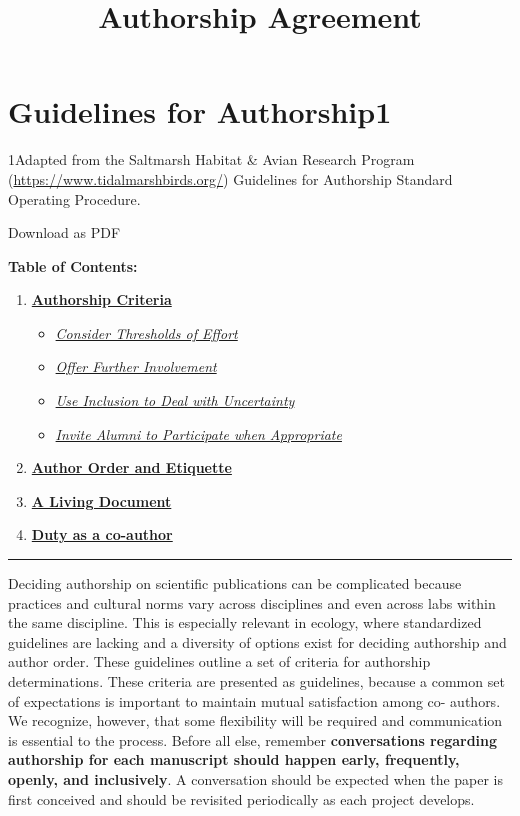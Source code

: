 \documentclass[]{article}
\title{Authorship Agreement}
\author{}
\date{}
\begin{document}
\maketitle

\hypertarget{guidelines-for-authorship1}{%
\section{Guidelines for Authorship1}\label{guidelines-for-authorship1}}

1Adapted from the Saltmarsh Habitat \& Avian Research Program
(\url{https://www.tidalmarshbirds.org/}) Guidelines for Authorship
Standard Operating Procedure.

Download as PDF

\textbf{Table of Contents:}

\begin{enumerate}
\def\labelenumi{\arabic{enumi}.}
\item
  \protect\hyperlink{author}{\textbf{Authorship Criteria}}

  \begin{itemize}
  \item
    \protect\hyperlink{threshold}{\emph{Consider Thresholds of Effort}}
  \item
    \protect\hyperlink{involvement}{\emph{Offer Further Involvement}}
  \item
    \protect\hyperlink{inclusion}{\emph{Use Inclusion to Deal with
    Uncertainty}}
  \item
    \protect\hyperlink{alum}{\emph{Invite Alumni to Participate when
    Appropriate}}
  \end{itemize}
\item
  \protect\hyperlink{order}{\textbf{Author Order and Etiquette}}
\item
  \protect\hyperlink{doc}{\textbf{A Living Document}}
\item
  \protect\hyperlink{duty}{\textbf{Duty as a co-author}}
\end{enumerate}

\begin{center}\rule{0.5\linewidth}{\linethickness}\end{center}

Deciding authorship on scientific publications can be complicated
because practices and cultural norms vary across disciplines and even
across labs within the same discipline. This is especially relevant in
ecology, where standardized guidelines are lacking and a diversity of
options exist for deciding authorship and author order. These guidelines
outline a set of criteria for authorship determinations. These criteria
are presented as guidelines, because a common set of expectations is
important to maintain mutual satisfaction among co- authors. We
recognize, however, that some flexibility will be required and
communication is essential to the process. Before all else, remember
\textbf{conversations regarding authorship for each manuscript should
happen early, frequently, openly, and inclusively}. A conversation
should be expected when the paper is first conceived and should be
revisited periodically as each project develops.
\end{document}
